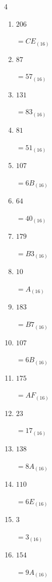 \begin{multicols}{4}
\begin{enumerate}
        $=60_{(16)}$

  \item $206$

        $=CE_{(16)}$

  \item $87$

        $=57_{(16)}$

\columnbreak %

  \item $131$

        $=83_{(16)}$

  \item $81$

        $=51_{(16)}$

  \item $107$

        $=6B_{(16)}$

  \item $64$

        $=40_{(16)}$

  \item $179$

        $=B3_{(16)}$

  \item $10$

        $=A_{(16)}$

  \item $183$

        $=B7_{(16)}$

  \item $107$

        $=6B_{(16)}$

  \item $175$

        $=AF_{(16)}$

  \item $23$

        $=17_{(16)}$

  \item $138$

        $=8A_{(16)}$

  \item $110$

        $=6E_{(16)}$

  \item $3$

        $=3_{(16)}$

  \item $154$

        $=9A_{(16)}$


\end{enumerate}
\end{multicols}
